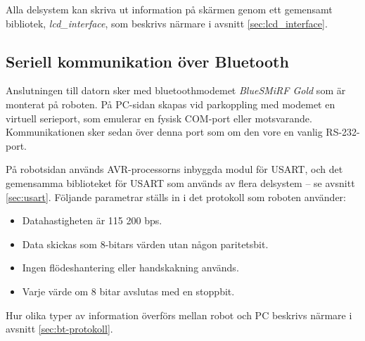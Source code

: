 Alla delsystem kan skriva ut information på skärmen genom ett gemensamt bibliotek, \textit{lcd\_interface}, som beskrivs närmare i avsnitt \ref{sec:lcd_interface}.


\subsection{Seriell kommunikation över Bluetooth}
Anslutningen till datorn sker med bluetoothmodemet \emph{BlueSMiRF Gold} som är monterat på roboten. På PC-sidan skapas vid parkoppling med modemet en virtuell serieport, som emulerar en fysisk COM-port eller motsvarande. Kommunikationen sker sedan över denna port som om den vore en vanlig RS-232-port. 

På robotsidan används AVR-processorns inbyggda modul för USART, och det gemensamma biblioteket för USART som används av flera delsystem -- se avsnitt \ref{sec:usart}. Följande parametrar ställs in i det protokoll som roboten använder:
\begin{itemize}
\item Datahastigheten är 115 200 bps.
\item Data skickas som 8-bitars värden utan någon paritetsbit.
\item Ingen flödeshantering eller handskakning används.
\item Varje värde om 8 bitar avslutas med en stoppbit.
\end{itemize}

Hur olika typer av information överförs mellan robot och PC beskrivs närmare i avsnitt \ref{sec:bt-protokoll}.
